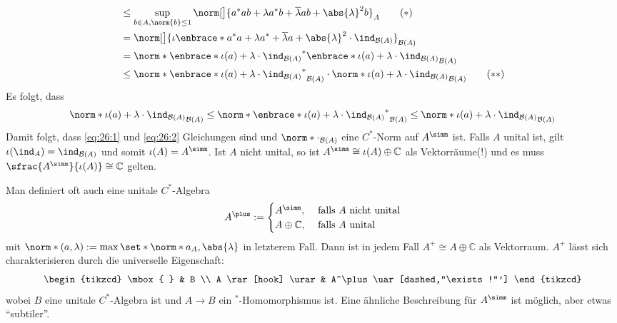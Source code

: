 \begin{beweis}
\begin{align}
		&\le \sup_{b \in A, \norm{b} \le 1} \norm[\big]{a^*ab + \lambda a^* b + \overline{\lambda} a b + \abs{\lambda}^2 b }_A \tag{$*$} \label{eq:26:1}\\
		&= \norm[\big]{\iota \enbrace*{a^* a + \lambda a^* + \overline{\lambda} a} + \abs{\lambda}^2 \cdot \ind_{\mathcal{B}(A)} }_{\mathcal{B}(A)} \\
		&= \norm*{ \enbrace*{\iota(a) + \lambda \cdot \ind_{\mathcal{B}(A)}}^* \enbrace*{\iota(a) + \lambda \cdot \ind_{\mathcal{B}(A)}}}_{\mathcal{B}(A)} \\
		&\le \norm*{\enbrace*{\iota(a) + \lambda \cdot \ind_{\mathcal{B}(A)}}^*}_{\mathcal{B}(A)}\cdot\norm*{\iota(a) + \lambda \cdot \ind_{\mathcal{B}(A)}}_{\mathcal{B}(A)} \tag{$**$} \label{eq:26:2}
	\end{align}
	Es folgt, dass 
	\begin{align}
		\norm*{\iota(a) + \lambda \cdot \ind_{\mathcal{B}(A)}}_{\mathcal{B}(A)} \le \norm*{\enbrace*{\iota(a) + \lambda \cdot \ind_{\mathcal{B}(A)}}^*}_{\mathcal{B}(A)}
		\le \norm*{\iota(a) + \lambda \cdot \ind_{\mathcal{B}(A)}}_{\mathcal{B}(A)} 
	\end{align}
	Damit folgt, dass \eqref{eq:26:1} und \eqref{eq:26:2} Gleichungen sind und $\norm*{\cdot }_{\mathcal{B}(A)}$ eine $C^*$-Norm auf $A^\simm$ ist. Falls $A$ unital ist, gilt
	$\iota(\ind_A) = \ind_{\mathcal{B}(A)}$ und somit $\iota(A)=A^\simm$. Ist $A$ nicht unital, so ist $A^\simm \cong \iota(A) \oplus \mathbb{C}$ als Vektorräume(!) und es muss
	$\sfrac{A^\simm}{\iota(A)}\cong \mathbb{C}$ gelten.
\end{beweis}

\begin{bemerkung}[{name=[Alternative Unitalisierung]},label=bem:27]
	Man definiert oft auch eine unitale $C^*$-Algebra 
	\[
		A^\plus := \begin{cases}
			A^\simm, &\text{ falls }A \text{ nicht unital} \\
			A  \oplus \mathbb{C} , &\text{ falls } A \text{ unital} 
		\end{cases}
	\]
	mit $\norm*{(a,\lambda)} := \max \set*{\norm*{a}_A, \abs{\lambda}}$ in letzterem Fall. 
	Dann ist in jedem Fall $A^\plus \cong A \oplus \mathbb{C}$ als Vektorraum. 
	$A^\plus$ lässt sich charakterisieren durch die universelle Eigenschaft:
	\[
		\begin{tikzcd}
			\mbox{ } & B \\
			A \rar[hook] \urar& A^\plus \uar[dashed,"\exists !"']
		\end{tikzcd}
	\]
	wobei $B$ eine unitale $C^*$-Algebra ist und $A \to B$ ein ${}^*$-Homomorphismus ist. Eine ähnliche Beschreibung für $A^\simm$ ist möglich, aber etwas \enquote{subtiler}.
\end{bemerkung}

